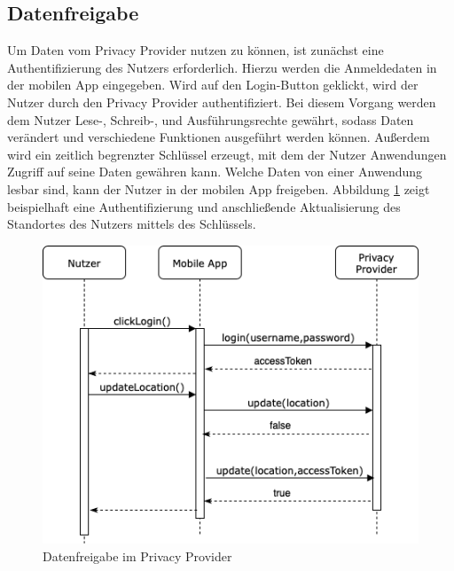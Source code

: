 \subsection{Datenfreigabe}
Um Daten vom Privacy Provider nutzen zu können, ist zunächst eine Authentifizierung des Nutzers erforderlich. Hierzu werden die Anmeldedaten in der mobilen App eingegeben. Wird auf den Login-Button geklickt, wird der Nutzer durch den Privacy Provider authentifiziert. Bei diesem Vorgang werden dem Nutzer Lese-, Schreib-, und Ausführungsrechte gewährt, sodass Daten verändert und verschiedene Funktionen ausgeführt werden können. Außerdem wird ein zeitlich begrenzter Schlüssel erzeugt, mit dem der Nutzer Anwendungen Zugriff auf seine Daten gewähren kann. Welche Daten von einer Anwendung lesbar sind, kann der Nutzer in der mobilen App freigeben. Abbildung \ref{fig:accesstoken} zeigt beispielhaft eine Authentifizierung und anschließende Aktualisierung des Standortes des Nutzers mittels des Schlüssels.  

\begin{figure}[!ht]
	\centering
	\includegraphics[width=1\linewidth]{Picture/AccessToken.png}
	\caption[Datenfreigabe im Privacy Provider]{Datenfreigabe im Privacy Provider}
	\label{fig:accesstoken}
\end{figure}
